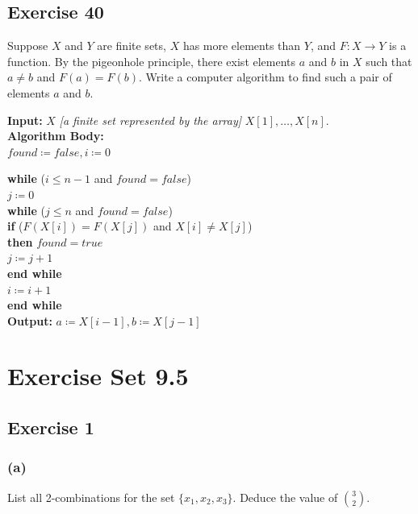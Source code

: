 \documentclass[14pt]{extarticle}
\begin{document}
\subsection{Exercise 40}
Suppose \(X\) and \(Y\) are finite sets, \(X\) has more elements than \(Y\), and \(F: X \to Y\) is a function. By 
the pigeonhole principle, there exist elements \(a\) and \(b\) in \(X\) such that \(a \neq b\) and \(F(a) = F(b)\). 
Write a computer algorithm to find such a pair of elements \(a\) and \(b\).

\begin{tcolorbox}[colframe=cyan]
{\bf Input:} \(X\) {\it [a finite set represented by the array]} \(X[1], \ldots, X[n]\). \\
{\bf Algorithm Body:} \\
\(found \coloneqq false, i \coloneqq 0\)
\end{tcolorbox}
\begin{tcolorbox}[colframe=cyan]
\begin{tabbing}
{\bf wh}\={\bf ile} (\(i \leq n-1\) and \(found = false\)) \\
        \> \(j \coloneqq 0\) \\
        \> {\bf wh}\={\bf ile} (\(j \leq n\) and \(found = false\))\\
        \>         \> {\bf if} (\(F(X[i]) = F(X[j])\) and \(X[i] \neq X[j]\)) \\
        \>         \> {\bf then} \(found = true\) \\
        \>         \> \(j \coloneqq j+1\) \\
        \> {\bf end while} \\
        \> \(i \coloneqq i+1\) \\
{\bf end while} \\
{\bf Output:} \(a \coloneqq X[i-1], b \coloneqq X[j-1]\) 
\end{tabbing}
\end{tcolorbox}

\section{Exercise Set 9.5}

\subsection{Exercise 1}
\subsubsection{(a)}
List all 2-combinations for the set \(\{x_1, x_2, x_3\}\). Deduce the value of \(\binom{3}{2}\).
\end{document}
